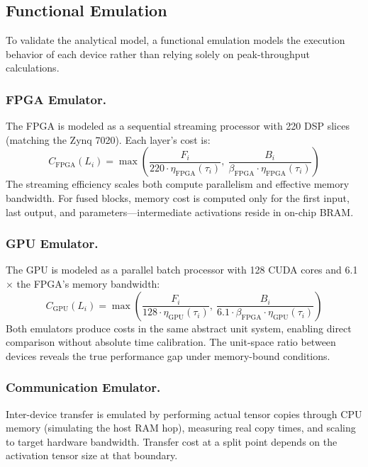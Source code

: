 \documentclass[runningheads]{llncs}
\begin{document}
\subsection{Functional Emulation}\label{sec:emulation}

To validate the analytical model, a functional emulation models the execution behavior of each device rather than relying solely on peak-throughput calculations.

\subsubsection{FPGA Emulator.} The FPGA is modeled as a sequential streaming processor with 220 DSP slices (matching the Zynq 7020). Each layer's cost is:
\begin{equation}
    C_{\text{FPGA}}(L_i) = \max\left(\frac{F_i}{220 \cdot \eta_{\text{FPGA}}(\tau_i)},\ \frac{B_i}{\beta_{\text{FPGA}} \cdot \eta_{\text{FPGA}}(\tau_i)}\right)
\end{equation}
The streaming efficiency scales both compute parallelism and effective memory bandwidth. For fused blocks, memory cost is computed only for the first input, last output, and parameters---intermediate activations reside in on-chip BRAM.

\subsubsection{GPU Emulator.} The GPU is modeled as a parallel batch processor with 128 CUDA cores and 6.1$\times$ the FPGA's memory bandwidth:
\begin{equation}
    C_{\text{GPU}}(L_i) = \max\left(\frac{F_i}{128 \cdot \eta_{\text{GPU}}(\tau_i)},\ \frac{B_i}{6.1 \cdot \beta_{\text{FPGA}} \cdot \eta_{\text{GPU}}(\tau_i)}\right)
\end{equation}
Both emulators produce costs in the same abstract unit system, enabling direct comparison without absolute time calibration. The unit-space ratio between devices reveals the true performance gap under memory-bound conditions.

\subsubsection{Communication Emulator.} Inter-device transfer is emulated by performing actual tensor copies through CPU memory (simulating the host RAM hop), measuring real copy times, and scaling to target hardware bandwidth. Transfer cost at a split point depends on the activation tensor size at that boundary.
\end{document}
